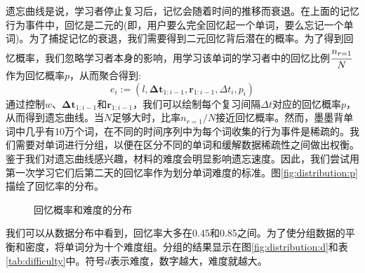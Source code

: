 遗忘曲线是说，学习者停止复习后，记忆会随着时间的推移而衰退。在上面的记忆行为事件中，回忆是二元的(即，用户要么完全回忆起一个单词，要么忘记一个单词)。为了捕捉记忆的衰退，我们需要得到二元回忆背后潜在的概率。为了得到回忆概率，我们忽略学习者本身的影响，用学习该单词的学习者中的回忆比例$\cfrac{n_{r=1}}{N}$作为回忆概率$p$，从而聚合得到:
\begin{equation}
e_{i} :=(l, \bm{\Delta t}_{1:i-1}, \bm r_{1:i-1}, \Delta t_i , p_i)
\end{equation}
通过控制$w$、$\bm{\Delta t}_{1:i-1}$和$\bm r_{1:i-1}$，我们可以绘制每个复习间隔$\Delta t$对应的回忆概率$p$，从而得到遗忘曲线。当$N$足够大时，比率$n_{r=1}/N$接近回忆概率。然而，墨墨背单词中几乎有10万个词，在不同的时间序列中为每个词收集的行为事件是稀疏的。我们需要对单词进行分组，以便在区分不同的单词和缓解数据稀疏性之间做出权衡。鉴于我们对遗忘曲线感兴趣，材料的难度会明显影响遗忘速度。因此，我们尝试用第一次学习它们后第二天的回忆率作为划分单词难度的标准。图\ref{fig:distribution:p}描绘了回忆率的分布。

\begin{figure}[htbp]
    \setlength{\subfigcapskip}{-1bp}
    \centering
    \begin{minipage}{\textwidth}
    \centering
    \subfigure{\label{fig:distribution:p}}\addtocounter{subfigure}{-2}
    \hspace{2em}
    \subfigure{\label{fig:distribution:d}}\addtocounter{subfigure}{-2}
    \end{minipage}
    \caption{回忆概率和难度的分布}
    \label{fig:distribution}
\end{figure}

我们可以从数据分布中看到，回忆率大多在0.45和0.85之间。为了使分组数据的平衡和密度，将单词分为十个难度组。分组的结果显示在图\ref{fig:distribution:d}和表\ref{tab:difficulty}中。符号$d$表示难度，数字越大，难度就越大。

